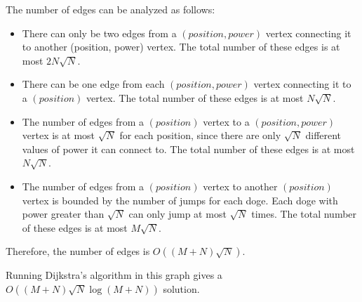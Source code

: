 \documentclass[a4paper,11pt]{article}
\begin{document}
The number of edges can be analyzed as follows:
\begin{itemize}

    \item There can only be two edges from a $(position, power)$ vertex connecting it to another (position, power) vertex. The total number of these edges is at most $2N\sqrt{N}$.
    \item There can be one edge from each $(position, power)$ vertex connecting it to a $(position)$ vertex. The total number of these edges is at most $N\sqrt{N}$.
    \item The number of edges from a $(position)$ vertex to a $(position, power)$ vertex is at most $\sqrt{N}$ for each position, since there are only $\sqrt{N}$ different values of power it can connect to. The total number of these edges is at most $N\sqrt{N}$.
    \item The number of edges from a $(position)$ vertex to another $(position)$ vertex is bounded by the number of jumps for each doge. Each doge with power greater than $\sqrt{N}$ can only jump at most $\sqrt{N}$ times. The total number of these edges is at most $M\sqrt{N}$.
\end{itemize}

Therefore, the number of edges is $O((M + N)\sqrt{N})$.

Running Dijkstra's algorithm in this graph gives a $O((M + N)\sqrt{N} \log(M + N))$ solution.
\end{document}
